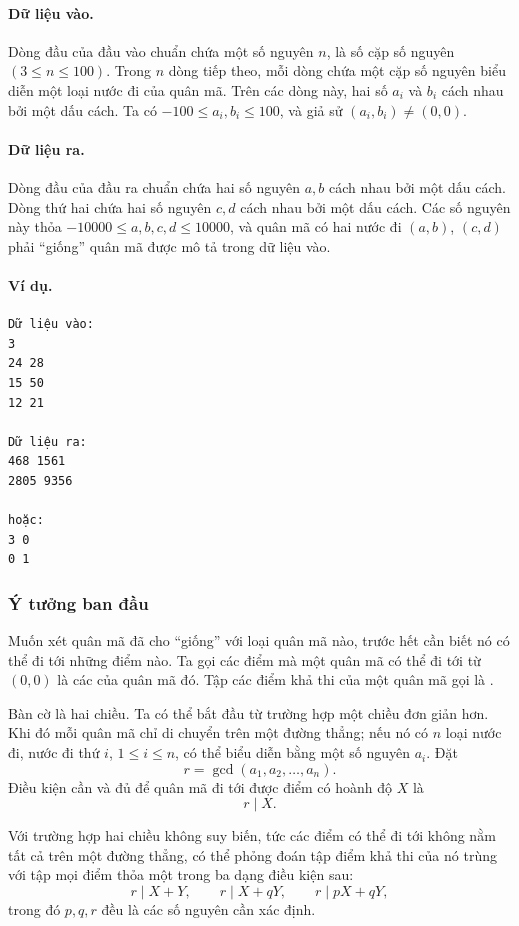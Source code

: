 \documentclass[11pt]{article}
\begin{document}
\paragraph{Dữ liệu vào.}
Dòng đầu của đầu vào chuẩn chứa một số nguyên \(n\), là số cặp số nguyên
\((3\le n\le 100)\). Trong \(n\) dòng tiếp theo, mỗi dòng chứa một cặp số
nguyên biểu diễn một loại nước đi của quân mã. Trên các dòng này, hai số
\(a_i\) và \(b_i\) cách nhau bởi một dấu cách. Ta có
\(-100\le a_i,b_i\le 100\), và giả sử \((a_i,b_i)\ne(0,0)\).

\paragraph{Dữ liệu ra.}
Dòng đầu của đầu ra chuẩn chứa hai số nguyên \(a,b\) cách nhau bởi một dấu
cách. Dòng thứ hai chứa hai số nguyên \(c,d\) cách nhau bởi một dấu cách.
Các số nguyên này thỏa \(-10000\le a,b,c,d\le 10000\), và quân mã có hai nước
đi \((a,b)\), \((c,d)\) phải ``giống'' quân mã được mô tả trong dữ liệu vào.

\paragraph{Ví dụ.}
\begin{verbatim}
Dữ liệu vào:
3
24 28
15 50
12 21

Dữ liệu ra:
468 1561
2805 9356

hoặc:
3 0
0 1
\end{verbatim}

\subsubsection{Ý tưởng ban đầu}

Muốn xét quân mã đã cho ``giống'' với loại quân mã nào, trước hết cần biết nó
có thể đi tới những điểm nào. Ta gọi các điểm mà một quân mã có thể đi tới từ
\((0,0)\) là các  của quân mã đó. Tập các điểm khả thi của
một quân mã gọi là .

Bàn cờ là hai chiều. Ta có thể bắt đầu từ trường hợp một chiều đơn giản hơn.
Khi đó mỗi quân mã chỉ di chuyển trên một đường thẳng; nếu nó có \(n\) loại
nước đi, nước đi thứ \(i\), \(1\le i\le n\), có thể biểu diễn bằng một số
nguyên \(a_i\). Đặt
\[
  r=\gcd(a_1,a_2,\ldots,a_n).
\]
Điều kiện cần và đủ để quân mã đi tới được điểm có hoành độ \(X\) là
\[
  r\mid X.
\]

Với trường hợp hai chiều không suy biến, tức các điểm có thể đi tới không nằm
tất cả trên một đường thẳng, có thể phỏng đoán tập điểm khả thi của nó trùng
với tập mọi điểm thỏa một trong ba dạng điều kiện sau:
\[
  r\mid X+Y,\qquad
  r\mid X+qY,\qquad
  r\mid pX+qY,
\]
trong đó \(p,q,r\) đều là các số nguyên cần xác định.
\end{document}
